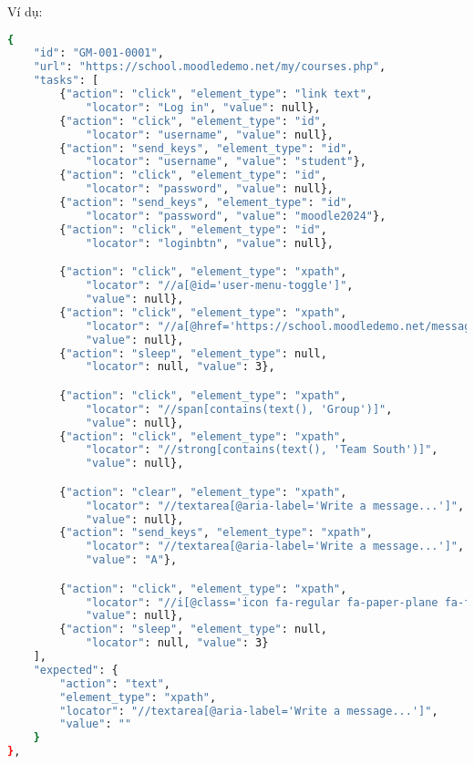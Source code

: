 Ví dụ:

\begin{lstlisting}[language=bash, caption={Ví dụ testcase GM-001-0001 ở level 2}, breaklines=true]
    {
    "id": "GM-001-0001",
    "url": "https://school.moodledemo.net/my/courses.php",
    "tasks": [
        {"action": "click", "element_type": "link text", 
            "locator": "Log in", "value": null},
        {"action": "click", "element_type": "id", 
            "locator": "username", "value": null},
        {"action": "send_keys", "element_type": "id", 
            "locator": "username", "value": "student"},
        {"action": "click", "element_type": "id", 
            "locator": "password", "value": null},
        {"action": "send_keys", "element_type": "id", 
            "locator": "password", "value": "moodle2024"},
        {"action": "click", "element_type": "id", 
            "locator": "loginbtn", "value": null},

        {"action": "click", "element_type": "xpath", 
            "locator": "//a[@id='user-menu-toggle']", 
            "value": null},
        {"action": "click", "element_type": "xpath", 
            "locator": "//a[@href='https://school.moodledemo.net/message/index.php']", 
            "value": null},
        {"action": "sleep", "element_type": null, 
            "locator": null, "value": 3},  

        {"action": "click", "element_type": "xpath", 
            "locator": "//span[contains(text(), 'Group')]", 
            "value": null},
        {"action": "click", "element_type": "xpath", 
            "locator": "//strong[contains(text(), 'Team South')]", 
            "value": null},

        {"action": "clear", "element_type": "xpath", 
            "locator": "//textarea[@aria-label='Write a message...']", 
            "value": null},
        {"action": "send_keys", "element_type": "xpath", 
            "locator": "//textarea[@aria-label='Write a message...']", 
            "value": "A"},

        {"action": "click", "element_type": "xpath", 
            "locator": "//i[@class='icon fa-regular fa-paper-plane fa-fw ']", 
            "value": null},
        {"action": "sleep", "element_type": null, 
            "locator": null, "value": 3}
    ],
    "expected": {
        "action": "text",
        "element_type": "xpath",
        "locator": "//textarea[@aria-label='Write a message...']",
        "value": ""
    }
},
\end{lstlisting}
